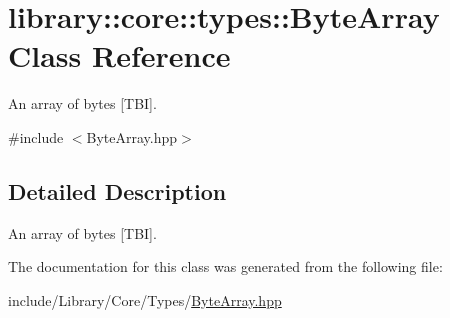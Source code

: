 \hypertarget{classlibrary_1_1core_1_1types_1_1_byte_array}{}\section{library\+:\+:core\+:\+:types\+:\+:Byte\+Array Class Reference}
\label{classlibrary_1_1core_1_1types_1_1_byte_array}


An array of bytes \mbox{[}T\+BI\mbox{]}.  




{\ttfamily \#include $<$Byte\+Array.\+hpp$>$}



\subsection{Detailed Description}
An array of bytes \mbox{[}T\+BI\mbox{]}. 

The documentation for this class was generated from the following file\+:\begin{DoxyCompactItemize}
\item 
include/\+Library/\+Core/\+Types/\hyperlink{_byte_array_8hpp}{Byte\+Array.\+hpp}\end{DoxyCompactItemize}
